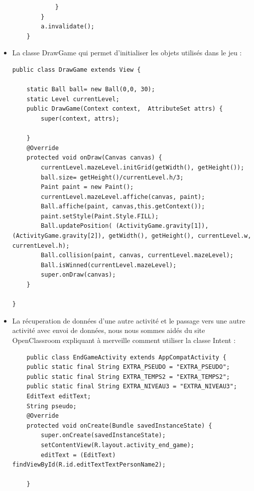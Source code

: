 \documentclass{article}
\begin{document}
\begin{itemize}
\begin{verbatim}
            }
        }
        a.invalidate();
    }
    \end{verbatim}
    
    \item La classe DrawGame qui permet d'initialiser les objets utilisés dans le jeu :
\begin{verbatim}
public class DrawGame extends View {

    static Ball ball= new Ball(0,0, 30);
    static Level currentLevel;
    public DrawGame(Context context,  AttributeSet attrs) {
        super(context, attrs);

    }
    @Override
    protected void onDraw(Canvas canvas) {
        currentLevel.mazeLevel.initGrid(getWidth(), getHeight());
        ball.size= getHeight()/currentLevel.h/3;
        Paint paint = new Paint();
        currentLevel.mazeLevel.affiche(canvas, paint);
        Ball.affiche(paint, canvas,this.getContext());
        paint.setStyle(Paint.Style.FILL);
        Ball.updatePosition( (ActivityGame.gravity[1]),  (ActivityGame.gravity[2]), getWidth(), getHeight(), currentLevel.w, currentLevel.h);
        Ball.collision(paint, canvas, currentLevel.mazeLevel);
        Ball.isWinned(currentLevel.mazeLevel);
        super.onDraw(canvas);
    }

}

\end{verbatim}
\item La récuperation de données d'une autre activité et le passage vers une autre activité avec envoi de données, nous nous sommes aidés du site OpenClassroom expliquant à merveille comment utiliser la classe Intent :
\begin{verbatim}
    public class EndGameActivity extends AppCompatActivity {
    public static final String EXTRA_PSEUDO = "EXTRA_PSEUDO";
    public static final String EXTRA_TEMPS2 = "EXTRA_TEMPS2";
    public static final String EXTRA_NIVEAU3 = "EXTRA_NIVEAU3";
    EditText editText;
    String pseudo;
    @Override
    protected void onCreate(Bundle savedInstanceState) {
        super.onCreate(savedInstanceState);
        setContentView(R.layout.activity_end_game);
        editText = (EditText) findViewById(R.id.editTextTextPersonName2);

    }



\end{verbatim}
\end{itemize}
\end{document}
